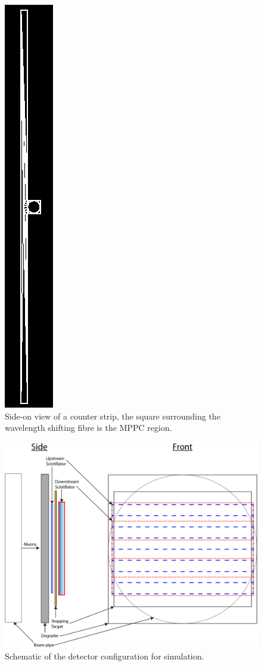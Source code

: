 \begin{figure}[hptb]
  \centering
    \includegraphics[scale=0.5, angle=90]{images/Geometry/full_strip.png}
  \caption{Side-on view of a counter strip, the square surrounding the wavelength shifting fibre is the MPPC region.}
  \label{fig:images_Geometry_full_strip}
\end{figure}

\begin{figure}[hptb]
  \centering
    \includegraphics[width=.9\textwidth]{images/Detector_setup_music5.png}
  \caption{Schematic of the detector configuration for simulation.}
  \label{fig:images_Detector_setup_music5}
\end{figure}

